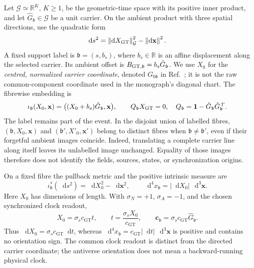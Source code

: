 \documentclass[final,5p,times,twocolumn,numbers,nopreprintline]{elsarticle}
\numberwithin{equation}{section}
\theoremstyle{definition}
\theoremstyle{remark}
\newcommand{\dd}{\mathop{}\!\mathrm d}
\newcommand{\bb}{\mathfrak b}
\newcommand{\RR}{\mathbb R}
\newcommand{\one}{\mathbf 1}
\newcommand{\vct}[1]{\boldsymbol{#1}}
\newcommand{\norm}[1]{\left\lVert #1\right\rVert}
\newcommand{\cGT}{c_{\mathrm{GT}}}
\begin{document}
Let \(\mathcal G\simeq\RR^K\), \(K\geq1\), be the geometric-time space
with its positive inner product, and let \(\hat G_{\bb}\in\mathcal G\)
be a unit carrier. On the ambient product with three spatial directions,
use the quadratic form
\[
 \dd s^2=\norm{\dd X_{\rm GT}}_{\mathcal G}^2-\norm{\dd\mathbf x}^2.
\]
A fixed support label is \(\bb=(s,b_s)\), where \(b_s\in\RR\)
is an affine displacement along the selected carrier. Its ambient offset is
\(B_{{\rm GT},\bb}=b_s\hat G_{\bb}\). We use \(X_0\) for the
\emph{centred, normalized carrier coordinate}, denoted \(G_{0\bb}\)
in Ref.~\cite{ChiapponeMonograph}; it is not the raw common-component
coordinate used in the monograph's diagonal chart. The fibrewise embedding is
\begin{equation}
 \iota_{\bb}(X_0,\mathbf x)
   =\bigl((X_0+b_s)\hat G_{\bb},\mathbf x\bigr),\qquad
 Q_{\bb}X_{\rm GT}=0,\quad
 Q_{\bb}=\one-\hat G_{\bb}\hat G_{\bb}^{\,T}.
 \label{eq:locking}
\end{equation}
The label remains part of the event. In the disjoint union of labelled
fibres, \((\bb,X_0,\mathbf x)\) and
\((\bb',X'_0,\mathbf x')\) belong to distinct fibres when
\(\bb\ne\bb'\), even if their forgetful ambient images coincide.
Indeed, translating a complete carrier line along itself leaves its
unlabelled image unchanged. Equality of those images therefore does not
identify the fields, sources, states, or synchronization origins.

On a fixed fibre the pullback metric and the positive intrinsic measure are
\begin{equation}
 \iota_{\bb}^{*}(\dd s^2)=\dd X_0^2-\dd\mathbf x^2,
 \qquad
 \dd^4x_{\bb}=|\dd X_0|\,\dd^3\mathbf x.
 \label{eq:pullback-metric}
\end{equation}
Here \(X_0\) has dimensions of length. With
\(\sigma_N=+1\), \(\sigma_A=-1\), and the chosen synchronized
clock readout,
\[
 X_0=\sigma_s\cGT t,
 \qquad t=\frac{\sigma_s X_0}{\cGT},
 \qquad
 \vct c_{\bb}=\sigma_s\cGT\hat G_{\bb}.
\]
Thus \(\dd X_0=\sigma_s\cGT\dd t\), whereas
\(\dd^4x_{\bb}=\cGT|\dd t|\,\dd^3\mathbf x\) is positive
and contains no orientation sign. The common clock readout is distinct
from the directed carrier coordinate; the antiverse orientation does not
mean a backward-running physical clock.
\end{document}
